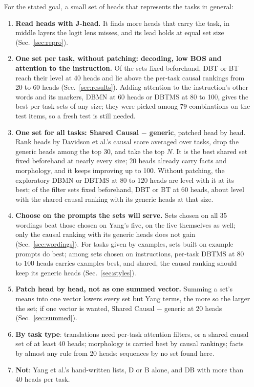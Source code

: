 \documentclass[10pt,a4paper]{article}
\begin{document}
For the stated goal, a small set of heads that represents the tasks in general:
\begin{enumerate}
\item \textbf{Read heads with J-head.} It finds more heads that carry the task, in middle layers the logit lens misses, and its lead holds at equal set size (Sec.~\ref{sec:repro}).
\item \textbf{One set per task, without patching: decoding, low BOS and attention to the instruction.} Of the sets fixed beforehand, DBT or BT reach their level at 40 heads and lie above the per-task causal rankings from 20 to 60 heads (Sec.~\ref{sec:results}). Adding attention to the instruction's other words and its markers, DBMN at 60 heads or DBTMS at 80 to 100, gives the best per-task sets of any size; they were picked among 79 combinations on the test items, so a fresh test is still needed.
\item \textbf{One set for all tasks: Shared Causal $-$ generic}, patched head by head. Rank heads by Davidson et al.'s causal score averaged over tasks, drop the generic heads among the top 30, and take the top $N$. It is the best shared set fixed beforehand at nearly every size; 20 heads already carry facts and morphology, and it keeps improving up to 100. Without patching, the exploratory DBMN or DBTMS at 80 to 120 heads are level with it at its best; of the filter sets fixed beforehand, DBT or BT at 60 heads, about level with the shared causal ranking with its generic heads at that size.
\item \textbf{Choose on the prompts the sets will serve.} Sets chosen on all 35 wordings beat those chosen on Yang's five, on the five themselves as well; only the causal ranking with its generic heads does not gain (Sec.~\ref{sec:wordings}). For tasks given by examples, sets built on example prompts do best; among sets chosen on instructions, per-task DBTMS at 80 to 100 heads carries examples best, and shared, the causal ranking should keep its generic heads (Sec.~\ref{sec:styles}).
\item \textbf{Patch head by head, not as one summed vector.} Summing a set's means into one vector lowers every set but Yang terms, the more so the larger the set; if one vector is wanted, Shared Causal $-$ generic at 20 heads (Sec.~\ref{sec:summed}).
\item \textbf{By task type}: translations need per-task attention filters, or a shared causal set of at least 40 heads; morphology is carried best by causal rankings; facts by almost any rule from 20 heads; sequences by no set found here.
\item \textbf{Not}: Yang et al.'s hand-written lists, D or B alone, and DB with more than 40 heads per task.
\end{enumerate}
\end{document}
